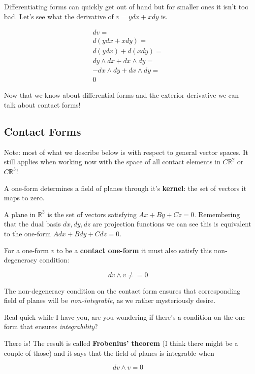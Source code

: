 \documentclass{article}
\theoremstyle{definition}
\begin{document}
Differentiating forms can quickly get out of hand but for smaller ones it isn't
too bad. Let's see what the derivative of $v = ydx + xdy$ is.

\begin{align*}
  dv = \\
  d(ydx + xdy) = \\
  d(ydx) + d(xdy) = \\
  dy \wedge dx + dx \wedge dy = \\
  -dx \wedge dy + dx \wedge dy = \\
  0
\end{align*}

Now that we know about differential forms and the exterior derivative we can
talk about contact forms!

\subsection {Contact Forms}

Note: most of what we describe below is with respect to general vector spaces.
It still applies when working now with the space of all contact elements in $C\mathbb{R}^{2}$ or
$C\mathbb{R}^{3}$! 

A one-form determines a field of planes through it's \textbf{kernel}: the set of
vectors it maps to zero.

A plane in $\mathbb{R}^{3}$ is the set of vectors satisfying $Ax + By + Cz = 0$.
Remembering that the dual basis $dx, dy, dz$ are projection functions we can see
this is equivalent to the one-form $Adx + Bdy + Cdz = 0$.

For a one-form $v$ to be a \textbf{contact one-form} it must also satisfy this
non-degeneracy condition:

\begin{equation}
  dv \wedge v \neq = 0
\end{equation}

The non-degeneracy condition on the contact form ensures that corresponding
field of planes will be \textit{non-integrable}, as we rather mysteriously
desire.

Real quick while I have you, are you wondering if there's a condition on the
one-form that ensures \textit{integrability}?

There is! The result is called \textbf{Frobenius' theorem} (I think there might
be a couple of those) and it says that the field of planes is integrable when

\begin{equation}
  dv \wedge v = 0
\end{equation}
\end{document}
